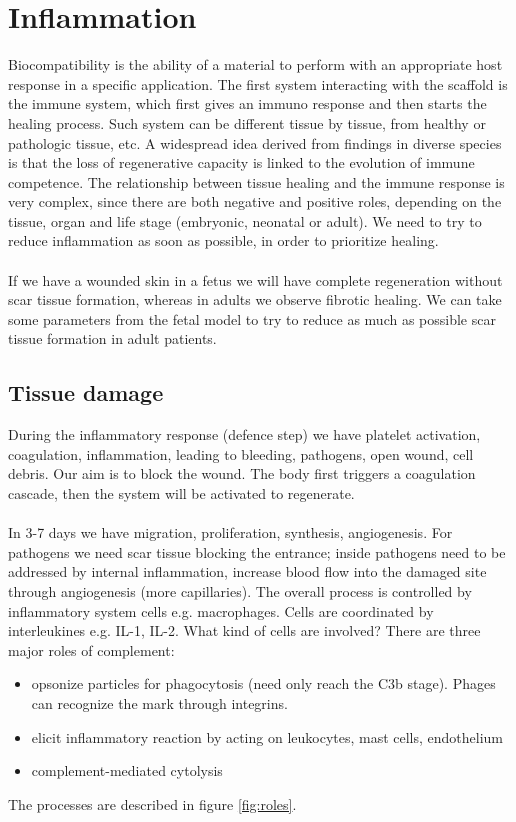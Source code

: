 \graphicspath{{chapters/inflammation/}}
\chapter{Inflammation}

Biocompatibility is the ability of a material to perform with an appropriate host response in a specific application.
The first system interacting with the scaffold is the immune system, which first gives an immuno response and then starts the healing process. 
Such system can be different tissue by tissue, from healthy or pathologic tissue, etc.
A widespread idea derived from findings in diverse species is that the loss of regenerative capacity is linked to the evolution of immune competence. 
The relationship between tissue healing and the immune response is very complex, since there are both negative and positive roles, depending on the tissue, organ and life stage (embryonic, neonatal or adult). We need to try to reduce inflammation as soon as possible, in order to prioritize healing.
\\
\\
\noindent
If we have a wounded skin in a fetus we will have complete regeneration without scar tissue formation, whereas in adults we observe fibrotic healing. We can take some parameters from the fetal model to try to reduce as much as possible scar tissue formation in adult patients.

\section{Tissue damage}
During the inflammatory response (defence step) we have platelet activation, coagulation, inflammation, leading to bleeding, pathogens, open wound, cell debris. 
Our aim is to block the wound.
The body first triggers a coagulation cascade, then the system will be activated to regenerate. 
\\
\\
\noindent
In 3-7 days we have migration, proliferation, synthesis, angiogenesis. 
For pathogens we need scar tissue blocking the entrance; inside pathogens need to be addressed by internal inflammation, increase blood flow into the damaged site through angiogenesis (more capillaries).
The overall process is controlled by inflammatory system cells e.g. macrophages. 
Cells are coordinated by interleukines e.g. IL-1, IL-2.
\noindent
What kind of cells are involved? There are three major roles of complement:
\begin{itemize}
\item opsonize particles for phagocytosis (need only reach the C3b stage). Phages can recognize the mark through integrins.
\item elicit inflammatory reaction by acting on leukocytes, mast cells, endothelium
\item complement-mediated cytolysis
\end{itemize}
\noindent
The processes are described in figure \ref{fig:roles}.

